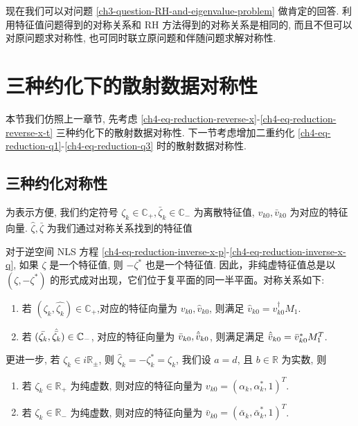 现在我们可以对问题 \ref{ch3-question-RH-and-eigenvalue-problem} 做肯定的回答. 利用特征值问题得到的对称关系和 RH 方法得到的对称关系是相同的, 而且不但可以对原问题求对称性, 也可同时联立原问题和伴随问题求解对称性.

\section{三种约化下的散射数据对称性}
本节我们仿照上一章节, 先考虑 \eqref{ch4-eq-reduction-reverse-x}-\eqref{ch4-eq-reduction-reverse-x-t} 三种约化下的散射数据对称性. 下一节考虑增加二重约化 \eqref{ch4-eq-reduction-q1}-\eqref{ch4-eq-reduction-q3} 时的散射数据对称性.

\subsection{三种约化对称性}
为表示方便, 我们约定符号 $ \zeta_{k} \in \mathbb{C}_{+}, \bar{\zeta}_{k} \in \mathbb{C}_{-} $ 为离散特征值, $ v_{k0}, \bar{v}_{k0} $ 为对应的特征向量. $\hat{\zeta}, \hat{\bar{\zeta}}$ 为我们通过对称关系找到的特征值
\iffalse
    \begin{theorem}[逆空间] %
        对于逆空间 NLS 方程 \eqref{ch4-eq-reduction-inverse-x-p}-\eqref{ch4-eq-reduction-inverse-x-q}, 如果 $ \zeta $ 是一个特征值, 则 $ -\zeta^{*} $ 也是一个特征值. 因此，非纯虚特征值总是以 $ (\zeta, -\zeta^{*}) $ 的形式成对出现，它们位于复平面的同一半平面。对称关系如下:
        \begin{enumerate}
            \item 若 $ (\zeta_{k}, \hat{\zeta_{k}}) \in \mathbb{C_{+}} $,对应的特征向量为 $ v_{k0}, \hat{v}_{k0}$, 则满足 $\hat{v}_{k0} = {v}_{k0}^{\dagger}M_{1}$.
            \item
                  若 $ (\bar{\zeta_{k}}, \hat{\bar{\zeta_{k}}}) \in \mathbb{C_{-}} $, 对应的特征向量为 $ \bar{v}_{k0}, \hat{\bar{v}}_{k0}$, 则满足满足 $\hat{\bar{v}}_{k0} = \bar{v}_{k0}^{*}M_{1}^{T}$.
        \end{enumerate}
        更进一步, 若 $\zeta_{k} \in i\mathbb{R}_{\pm}$, 则 $\hat{\zeta}_{k} = -\zeta_{k}^{*} = \zeta_{k}$, 我们设 $ a = d $, 且 $ b \in \mathbb{R} $ 为实数, 则
        \begin{enumerate}
            \item 若 $\zeta_{k} \in \mathbb{R}_{+}$ 为纯虚数, 则对应的特征向量为 $v_{k0} = (\alpha_{k}, \alpha_{k}^{*}, 1)^{T}$.
            \item 若 $\zeta_{k} \in \mathbb{R}_{-}$ 为纯虚数, 则对应的特征向量为 $\bar{v}_{k0} = (\bar{\alpha}_{k}, \bar{\alpha}_{k}^{*}, 1)^{T}$.
        \end{enumerate}
    \end{theorem}
